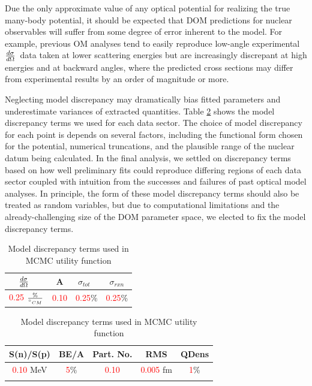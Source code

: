 \documentclass[twocolumn,secnumarabic,amssymb, nobibnotes, aps, prl,
superscriptaddress, nobalancelastpage]{revtex4}
\newcommand{\tot}{\ensuremath{\sigma_{tot}}}
\newcommand{\rxn}{\ensuremath{\sigma_{rxn}}}
\newcommand{\el}{\ensuremath{\frac{\lowercase{d}\sigma}{\lowercase{d}\Omega}}}
\begin{document}
Due the only approximate value
of any optical potential for realizing the true many-body 
potential, it should be expected that DOM predictions for nuclear observables
will suffer from some degree of error inherent to the model. For example, previous
OM analyses tend to easily reproduce low-angle experimental \el\ data taken at
lower scattering energies but are increasingly discrepant at high energies
and at backward angles, where the predicted cross sections may
differ from experimental results by an order of magnitude or more. 

Neglecting model discrepancy may
dramatically bias fitted parameters and underestimate variances of extracted
quantities. Table \ref{ModelDiscrepancyTable} shows the model discrepancy terms we used 
for each data sector. The choice of model discrepancy for each point
is depends on several factors, including the functional form chosen for the
potential, numerical truncations, and the plausible range of the nuclear datum being 
calculated. In the final analysis, we settled on discrepancy terms based
on how well preliminary fits could reproduce differing regions of each data sector
coupled with intuition from the successes and failures of past optical model analyses.
In principle, the form of these model discrepancy terms should also be treated as random
variables, but due to computational limitations and the already-challenging size
of the DOM parameter space, we elected to fix the model discrepancy terms.

\begin{table}[tb]
    \caption[Model discrepancy terms used in MCMC utility function]
    {Model discrepancy terms used in MCMC utility function} 
    \label{ModelDiscrepancyTable}
    \centering
    \begin{tabular}{ c c c c }
        \hline
        \el\ & A & \tot\ & \rxn \\
        \hline
        \textcolor{red}{0.25} $\frac{\%}{\degree_{CM}}$ & \textcolor{red}{0.10}
            & \textcolor{red}{0.25}\% & \textcolor{red}{0.25}\% \\
        \hline
    \end{tabular}

    \vfill

    \begin{tabular}{ c c c c c }
        \hline
        S(n)/S(p) & BE/A & Part. No. & RMS & QDens \\
        \hline
        \textcolor{red}{0.10} MeV & \textcolor{red}{5}\% & \textcolor{red}{0.10}
        & \textcolor{red}{0.005} fm & \textcolor{red}{1}\%\\
        \\
        \hline
    \end{tabular}
\end{table}
\end{document}
